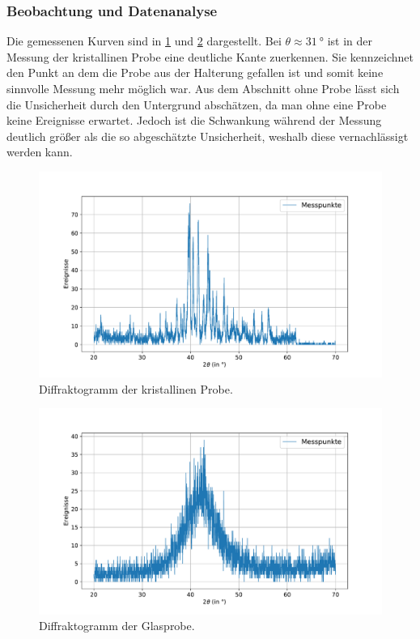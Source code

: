 \documentclass[
	a4paper,
	12pt,
	pagesize,
	ngerman
]{scrartcl}
\begin{document}
	\subsubsection{Beobachtung und Datenanalyse}
	Die gemessenen Kurven sind in \cref{fig_xrd_kristallin} und \cref{fig_xrd_glas} dargestellt.
	Bei $\theta \approx \SI{31}{\degree}$ ist in der Messung der kristallinen Probe eine deutliche Kante zuerkennen.
	Sie kennzeichnet den Punkt an dem die Probe aus der Halterung gefallen ist und somit keine sinnvolle Messung mehr möglich war.
	Aus dem Abschnitt ohne Probe lässt sich die Unsicherheit durch den Untergrund abschätzen, da man ohne eine Probe keine Ereignisse erwartet.
	Jedoch ist die Schwankung während der Messung deutlich größer als die so abgeschätzte Unsicherheit, weshalb diese vernachlässigt werden kann.
	\begin{figure}[H]
			\includegraphics[width=\linewidth]{img/XRD_Kristallin_45_25.pdf}
			\caption{Diffraktogramm der kristallinen Probe.}
			\label{fig_xrd_kristallin}
	\end{figure}
	\begin{figure}[H]
			\includegraphics[width=\linewidth]{img/XRD_Glas_45_25.pdf}
			\caption{Diffraktogramm der Glasprobe.}
			\label{fig_xrd_glas}
	\end{figure}
\end{document}
